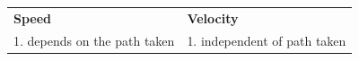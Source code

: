 {{    \addtocounter{footnote}{-0}
    
          }{ %
        
    
        \begin{center}
      
      \label{m38791*id66486}
      
    \noindent
      \tablelasttail{}
      \begin{xtabular}[t]{|l|l|}\hline
    
    
        
                  \textbf{Speed}
                 &
    
    
        
                  \textbf{Velocity}
     \tabularnewline{}
    
    
        1. depends on the path taken &
    
    
        1. independent of path taken%
     \tabularnewline{}
    
    

\end{xtabular}
\end{center}}}
